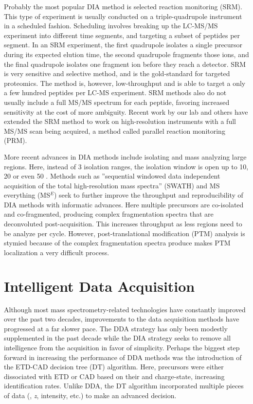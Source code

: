 Probably the most popular DIA method is selected reaction monitoring (SRM).\cite{mrm2,mrm3} This type of experiment is usually conducted on a triple-quadrupole instrument in a scheduled fashion. Scheduling involves breaking up the LC-MS/MS experiment into different time segments, and targeting a subset of peptides per segment. In an SRM experiment, the first quadrupole isolates a single precursor during its expected elution time, the second quadrupole fragments those ions, and the final quadrupole isolates one fragment ion before they reach a detector. SRM is very sensitive and selective method, and is the gold-standard for targeted proteomics. The method is, however, low-throughput and is able to target a only a few hundred peptides per LC-MS experiment.\cite{} SRM methods also do not usually include a full MS/MS spectrum for each peptide, favoring increased sensitivity at the cost of more ambiguity. Recent work by our lab and others have extended the SRM method to work on high-resolution instruments with a full MS/MS scan being acquired, a method called parallel reaction monitoring (PRM).\cite{prm1,prm2} 

More recent advances in DIA methods include isolating and mass analyzing large \mz{} regions. Here, instead of 3 \mz{} isolation ranges, the isolation window is open up to 10, 20 or even 50 \mz{}. Methods such as ''sequential windowed data independent acquisition of the total high-resolution mass spectra'' (SWATH) and MS everything (MS$^E$) seek to further improve the throughput and reproducibility of DIA methods with informatic advances.\cite{swath,mse} Here multiple precursors are co-isolated and co-fragmented, producing complex fragmentation spectra that are deconvoluted post-acquisition. This increases throughput as less \mz{} regions need to be analyze per cycle. However, post-translational modification (PTM) analysis is stymied because of the complex fragmentation spectra produce makes PTM localization a very difficult process.

\section{Intelligent Data Acquisition}
Although most mass spectrometry-related technologies have constantly improved over the past two decades, improvements to the data acquisition methods have progressed at a far slower pace. The DDA strategy has only been modestly supplemented in the past decade while the DIA strategy seeks to remove all intelligence from the acquisition in favor of simplicity. Perhaps the biggest step forward in increasing the performance of DDA methods was the introduction of the ETD-CAD decision tree (DT) algorithm.\cite{decisiontree} Here, precursors were either dissociated with ETD or CAD based on their \mz{} and charge-state, increasing identification rates. Unlike DDA, the DT algorithm incorporated multiple pieces of data (\mz{}, \emph{z}, intensity, etc.) to make an advanced decision.

